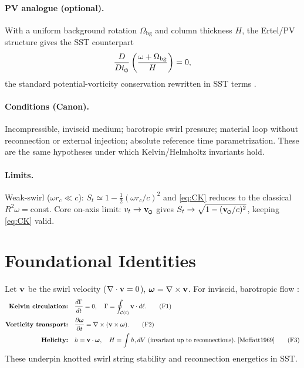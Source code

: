 \documentclass[11pt]{article}
\begin{document}
    \paragraph{PV analogue (optional).}
    With a uniform background rotation $\Omega_{\text{bg}}$ and column thickness $H$,
    the Ertel/PV structure gives the SST counterpart
    \begin{equation}
        \frac{D}{Dt_{\swirlarrow}}
        \left(
            \frac{\omega+\Omega_{\text{bg}}}{H}
        \right)=0,
        \label{eq:PV-analogue}
    \end{equation}
    the standard potential-vorticity conservation rewritten in SST terms \cite{Ertel1942,Batchelor1967}.

    \paragraph{Conditions (Canon).}
    Incompressible, inviscid medium; barotropic swirl pressure; material loop without reconnection or
    external injection; absolute reference time parametrization. These are the same hypotheses under which
    Kelvin/Helmholtz invariants hold.

    \paragraph{Limits.}
    Weak-swirl ($\omega r_c\!\ll\!c$): $S_t\simeq 1-\tfrac{1}{2}(\omega r_c/c)^2$ and \eqref{eq:CK} reduces to the
    classical $R^2\omega=\text{const}$. Core on-axis limit: $v_t\to\vswirl$ gives
    $S_t\to \sqrt{1-(\vswirl/c)^2}$, keeping \eqref{eq:CK} valid.

\section{Foundational Identities}
\label{sec:foundational-identities}
    Let $\vb v$ be the swirl velocity ($\nabla\cdot \vb v=0$), $\bm{\omega}=\nabla\times \vb v$. For inviscid, barotropic flow \cite{Helmholtz1858,Kelvin1869,Batchelor1967,LandauLifshitz1987}:
    \begin{align}
    \textbf{Kelvin circulation:} & \quad \frac{d\Gamma}{dt}=0,\quad \Gamma=\oint_{\mathcal{C}(t)} \vb v\cdot d\vb \ell. \tag{F1} \label{eq:kelvin} \\
    \textbf{Vorticity transport:} & \quad \pdv{\bm{\omega}}{t} = \nabla\times(\vb v\times \bm{\omega}). \tag{F2} \label{eq:vorticity-transport}\\
    \textbf{Helicity:} & \quad h=\vb v\cdot \bm{\omega},\quad H=\int h, dV\ \text{(invariant up to reconnections)}.~\cite{Moffatt1969} \tag{F3}\label{eq:helicity}
    \end{align}
    These underpin knotted swirl string stability and reconnection energetics in SST.
\end{document}
